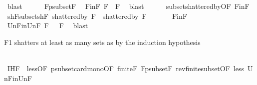 \begin{isabellebody}
\ blast\isanewline
\ \ \ \ \isamarkupfalse%
\ F{}{\isacharunderscore}{\kern0pt}psubset{\isacharunderscore}{\kern0pt}F\ \isamarkupfalse%
\ F{}{\isacharunderscore}{\kern0pt}in{\isacharunderscore}{\kern0pt}F{\isacharcolon}{\kern0pt}\ {\isachardoublequoteopen}{\isacharquery}{\kern0pt}F{}\ {\isasymsubseteq}\ F{\isachardoublequoteclose}\ \isamarkupfalse%
\ blast\isanewline
\ \ \ \ \isamarkupfalse%
\ subset{\isacharunderscore}{\kern0pt}shattered{\isacharunderscore}{\kern0pt}by{\isacharbrackleft}{\kern0pt}OF\ F{}{\isacharunderscore}{\kern0pt}in{\isacharunderscore}{\kern0pt}F{\isacharbrackright}{\kern0pt}\ \isamarkupfalse%
\ shF{}{\isacharunderscore}{\kern0pt}subset{\isacharunderscore}{\kern0pt}shF{\isacharcolon}{\kern0pt}\ {\isachardoublequoteopen}shattered{\isacharunderscore}{\kern0pt}by\ {\isacharquery}{\kern0pt}F{}\ {\isasymsubseteq}\ shattered{\isacharunderscore}{\kern0pt}by\ F{\isachardoublequoteclose}\ \isacommand{{\isachardot}{\kern0pt}}\isamarkupfalse%
\isanewline
\ \ \ \ \isamarkupfalse%
\ F{}{\isacharunderscore}{\kern0pt}in{\isacharunderscore}{\kern0pt}F\ \isamarkupfalse%
\ Un{\isacharunderscore}{\kern0pt}F{}{\isacharunderscore}{\kern0pt}in{\isacharunderscore}{\kern0pt}Un{\isacharunderscore}{\kern0pt}F{\isacharcolon}{\kern0pt}{\isachardoublequoteopen}{\isasymUnion}\ {\isacharquery}{\kern0pt}F{}\ {\isasymsubseteq}\ {\isasymUnion}\ F{\isachardoublequoteclose}\ \isamarkupfalse%
\ blast%
\begin{isamarkuptext}%
F1 shatters at least as many sets as  by the induction hypothesis%
\end{isamarkuptext}\isamarkuptrue%
\ \ \ \ \isamarkupfalse%
\ IH{\isacharunderscore}{\kern0pt}F{}\ {\isacharequal}{\kern0pt}\ less{\isacharparenleft}{\kern0pt}{}{\isacharparenright}{\kern0pt}{\isacharbrackleft}{\kern0pt}OF\ psubset{\isacharunderscore}{\kern0pt}card{\isacharunderscore}{\kern0pt}mono{\isacharbrackleft}{\kern0pt}OF\ finite{\isacharunderscore}{\kern0pt}F\ F{}{\isacharunderscore}{\kern0pt}psubset{\isacharunderscore}{\kern0pt}F{\isacharbrackright}{\kern0pt}\ rev{\isacharunderscore}{\kern0pt}finite{\isacharunderscore}{\kern0pt}subset{\isacharbrackleft}{\kern0pt}OF\ less{\isacharparenleft}{\kern0pt}{}{\isacharparenright}{\kern0pt}\ Un{\isacharunderscore}{\kern0pt}F{}{\isacharunderscore}{\kern0pt}in{\isacharunderscore}{\kern0pt}Un{\isacharunderscore}{\kern0pt}F{\isacharbrackright}{\kern0pt}{\isacharbrackright}{\kern0pt}\isanewline

\end{isabellebody}
